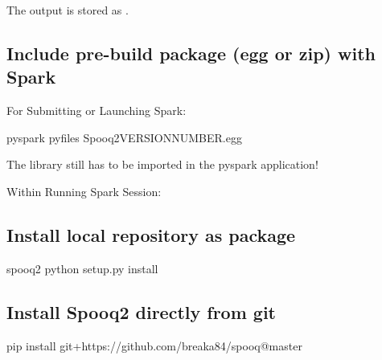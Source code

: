\documentclass[a4paper,10pt, twoside,english]{sphinxmanual}
\begin{document}
The output is stored as .


\subsection{Include pre-build package (egg or zip) with Spark}
\label{\detokenize{installation:include-pre-build-package-egg-or-zip-with-spark}}
For Submitting or Launching Spark:

\begin{sphinxVerbatim}[commandchars=\\\{\}]
\PYGZdl{} pyspark \PYGZhy{}\PYGZhy{}py\PYGZhy{}files Spooq2\PYGZhy{}\PYGZlt{}VERSION\PYGZus{}NUMBER\PYGZgt{}.egg
\end{sphinxVerbatim}

The library still has to be imported in the pyspark application!

Within Running Spark Session:

\begin{sphinxVerbatim}[commandchars=\\\{\}]
 
\end{sphinxVerbatim}


\subsection{Install local repository as package}
\label{\detokenize{installation:install-local-repository-as-package}}
\begin{sphinxVerbatim}[commandchars=\\\{\}]
\PYGZdl{}  spooq2
\PYGZdl{} python setup.py install
\end{sphinxVerbatim}


\subsection{Install Spooq2 directly from git}
\label{\detokenize{installation:install-spooq2-directly-from-git}}
\begin{sphinxVerbatim}[commandchars=\\\{\}]
\PYGZdl{} pip install git+https://github.com/breaka84/spooq@master
\end{sphinxVerbatim}
\end{document}
